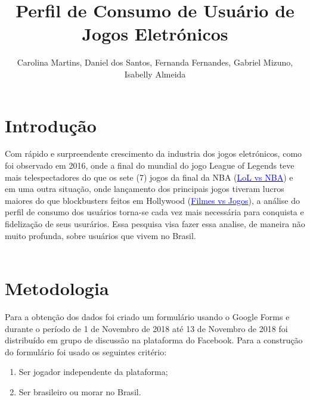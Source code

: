 \documentclass[11pt,a4paper]{article}
\title{Perfil de Consumo de Usuário de Jogos Eletrónicos}
\author{Carolina Martins, Daniel dos Santos, Fernanda Fernandes, Gabriel Mizuno, Isabelly  Almeida}
\date{ }
\begin{document}
 
\maketitle
 
\tableofcontents

\newpage
\section{Introdução}

Com rápido e surpreendente crescimento da industria dos jogos eletrónicos, como foi observado em 2016, onde a final do mundial do jogo League of Legends teve mais telespectadores do que os sete (7) jogos da final da NBA (\href{https://bit.ly/2Dvdtw9}{\textcolor{blue}{LoL vs NBA}}) e em uma outra situação, onde lançamento dos principais jogos tiveram lucros maiores do que blockbusters feitos em Hollywood  (\href{https://bit.ly/2FfWHTk}{\textcolor{blue}{Filmes vs Jogos}}), a análise do perfil de consumo dos usuários torna-se cada vez mais necessária para conquista e fidelização de seus usurários. Essa pesquisa visa fazer essa analise, de maneira não muito profunda, sobre usuários que vivem no Brasil. 
\\ 
\\
 
\section{Metodologia}

Para a obtenção dos dados foi criado um formulário usando o Google Forms  e durante o período de 1 de Novembro de 2018 até 13 de Novembro de 2018 foi distribuído em grupo de discussão na plataforma do Facebook. Para a construção do formulário foi usado os seguintes critério:

\begin{enumerate}[label=(\roman*)]
\item Ser jogador independente da plataforma;
\item Ser brasileiro ou morar no Brasil.
\end{enumerate}
\end{document}
